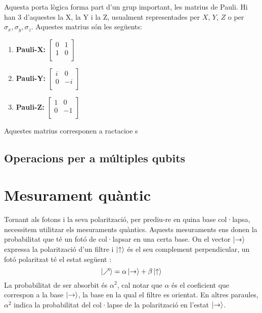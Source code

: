 Aquesta porta lògica forma part d'un grup important, les matrius de Pauli. Hi han 3 d'aquestes la X, la Y i la Z, usualment representades per $X$, $Y$, $Z$ o per $\sigma_x, \sigma_y, \sigma_z$. Aquestes matrius són les següents:
\begin{enumerate}
	\item \textbf{Pauli-X:}
	$
	\begin{bmatrix} 0 & 1\\ 1 & 0\\ \end{bmatrix}
	$
	\item \textbf{Pauli-Y:}
	$
	\begin{bmatrix} i & 0\\ 0 & -i\\ \end{bmatrix}
	$
	\item \textbf{Pauli-Z:} 
	$
	\begin{bmatrix} 1 & 0\\ 0 & -1\\ \end{bmatrix}
	$
\end{enumerate}

Aquestes matrius corresponen a ractacioe s 


\subsection{Operacions per a múltiples qubits}

\section{Mesurament quàntic}
Tornant als fotons i la seva polarització, per prediu-re en quina base col·lapsa, necessitem utilitzar els mesuraments quàntics. Aquests mesuraments ens donen la probabilitat que té un fotó de col·lapsar en una certa base. 
On el vector $\ket{\text{\textrightarrow}}$ expressa la polarització d'un filtre i $\ket{\text{\textuparrow}}$ és el seu complement perpendicular, un fotó polaritzat té el estat següent \cite{QC_intro:photon}: 
$$
\ket{\nearrow} = \alpha\ket{\text{\textrightarrow}} + \beta\ket{\text{\textuparrow}}
$$
La probabilitat de ser absorbit és $\alpha^2$, cal notar que $\alpha$ és el coeficient que correspon a la base $\ket{\text{\textrightarrow}}$, la base en la qual el filtre es orientat. En altres paraules, $\alpha^2$ indica la probabilitat del col·lapse de la polarització en l'estat $\ket{\text{\textrightarrow}}$. 

